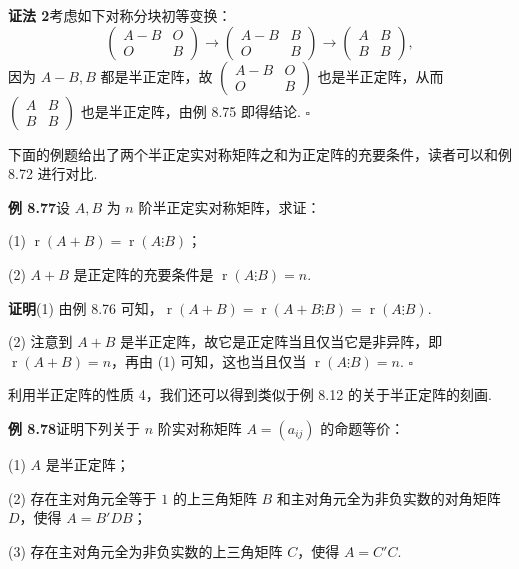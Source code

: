 \documentclass[UTF8,12pt,a4paper,fontset=fandol]{ctexart}
\begin{document}
\noindent\textbf{证法 2}\quad 考虑如下对称分块初等变换：
\[
\left(\begin{array}{cc}
A-B & O\\
O & B
\end{array}\right)
\to
\left(\begin{array}{cc}
A-B & B\\
O & B
\end{array}\right)
\to
\left(\begin{array}{cc}
A & B\\
B & B
\end{array}\right),
\]
因为 $A-B,B$ 都是半正定阵，故 $\left(\begin{array}{cc}A-B&O\\ O&B\end{array}\right)$ 也是半正定阵，从而 $\left(\begin{array}{cc}A&B\\ B&B\end{array}\right)$ 也是半正定阵，由例 8.75 即得结论. $\ensuremath{\square}$

下面的例题给出了两个半正定实对称矩阵之和为正定阵的充要条件，读者可以和例 8.72 进行对比.

\noindent\textbf{例 8.77}\quad 设 $A,B$ 为 $n$ 阶半正定实对称矩阵，求证：

(1) $\operatorname{r}(A+B)=\operatorname{r}(A\vdots B)$；

(2) $A+B$ 是正定阵的充要条件是 $\operatorname{r}(A\vdots B)=n$.

\noindent\textbf{证明}\quad (1) 由例 8.76 可知，$\operatorname{r}(A+B)=\operatorname{r}(A+B\vdots B)=\operatorname{r}(A\vdots B)$.

(2) 注意到 $A+B$ 是半正定阵，故它是正定阵当且仅当它是非异阵，即 $\operatorname{r}(A+B)=n$，再由 (1) 可知，这也当且仅当 $\operatorname{r}(A\vdots B)=n$. $\ensuremath{\square}$

利用半正定阵的性质 4，我们还可以得到类似于例 8.12 的关于半正定阵的刻画.

\noindent\textbf{例 8.78}\quad 证明下列关于 $n$ 阶实对称矩阵 $A=(a_{ij})$ 的命题等价：

(1) $A$ 是半正定阵；

(2) 存在主对角元全等于 $1$ 的上三角矩阵 $B$ 和主对角元全为非负实数的对角矩阵 $D$，使得 $A=B'DB$；

(3) 存在主对角元全为非负实数的上三角矩阵 $C$，使得 $A=C'C$.
\end{document}
